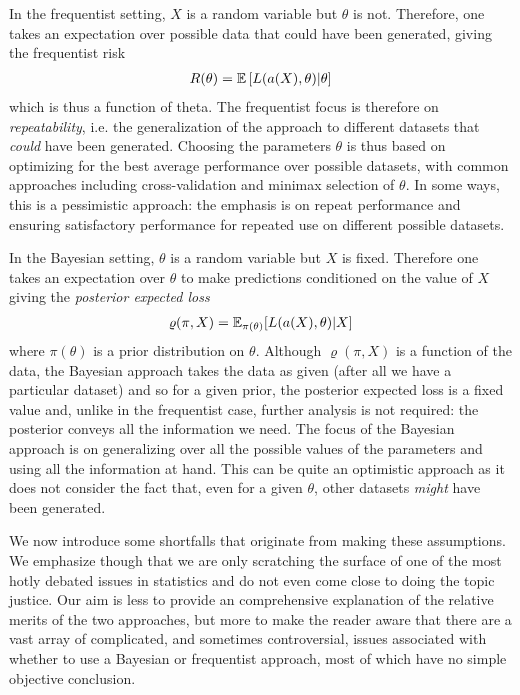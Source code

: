 In the
frequentist setting, $X$ is a random variable but $\theta$ is not.  Therefore, one takes an expectation over possible data
that could have been generated, giving the frequentist risk~\cite{vapnik1998statistical}
\begin{align}
\label{eq:bayes:freq-risk}
R(\theta)  = \mathbb{E}\left[L(a(X),\theta) | \theta \right]
\end{align}
which is thus a function of theta.
The frequentist focus is therefore on \emph{repeatability}, i.e.
the generalization of the approach to different datasets that \emph{could} have been generated.
Choosing the parameters $\theta$ is thus based on optimizing for the best average performance over possible datasets,
with common approaches including cross-validation and minimax selection of $\theta$.  In some ways, this is a pessimistic
approach: the emphasis is on repeat performance and ensuring satisfactory performance for repeated use on different possible
datasets.  

In the Bayesian setting, $\theta$ is a random variable but $X$ is fixed.  Therefore one takes an expectation over $\theta$
to make predictions conditioned on the value of $X$ giving the \emph{posterior expected loss}~\cite{robert2007bayesian}
\begin{align}
\label{eq:bayes:bayes-est}
\varrho(\pi,X) = \mathbb{E}_{\pi(\theta)} [L(a(X),\theta) | X]
\end{align}
where $\pi(\theta)$ is a prior distribution on $\theta$.  Although $\varrho(\pi,X)$ is a function of the data, the Bayesian
approach takes the data as given (after all we have a particular dataset) and so for a given prior, the posterior
expected loss is a fixed value and, unlike in the frequentist case, further analysis is not required: the posterior
conveys all the information we need.  The focus of the Bayesian approach is on generalizing over all the possible values of
the parameters and using all the information at hand.  
This can be quite an optimistic approach as it does not consider the fact that, even for a given $\theta$,
other datasets \emph{might} have been generated.

We now introduce some shortfalls that originate from making these assumptions.  We emphasize though that we are only
scratching the surface of one of the most hotly debated issues in statistics and do not even come close to doing
the topic justice.  Our aim is less to provide an comprehensive explanation of the relative merits of the two approaches, but
more to make the reader aware that there are a vast array of complicated, and sometimes controversial,
issues associated with whether to use a Bayesian or
frequentist approach, most of which have no simple objective conclusion.


